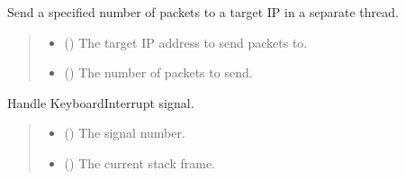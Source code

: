\documentclass[letterpaper,10pt,english]{sphinxmanual}
\begin{document}

\begin{fulllineitems}
\label{\detokenize{synflood:synflood.send_packets_thread}}
\pysigstartsignatures
{}
\pysigstopsignatures
\sphinxAtStartPar
Send a specified number of packets to a target IP in a separate thread.
\begin{quote}\begin{description}
\begin{itemize}
\item {} 
\sphinxAtStartPar
{} () \textendash{} The target IP address to send packets to.

\item {} 
\sphinxAtStartPar
{} () \textendash{} The number of packets to send.

\end{itemize}

\end{description}\end{quote}

\end{fulllineitems}


\begin{fulllineitems}
\label{\detokenize{synflood:synflood.signal_handler}}
\pysigstartsignatures
{}
\pysigstopsignatures
\sphinxAtStartPar
Handle KeyboardInterrupt signal.
\begin{quote}\begin{description}
\begin{itemize}
\item {} 
\sphinxAtStartPar
{} () \textendash{} The signal number.

\item {} 
\sphinxAtStartPar
{} () \textendash{} The current stack frame.

\end{itemize}

\end{description}\end{quote}

\end{fulllineitems}
\end{document}
